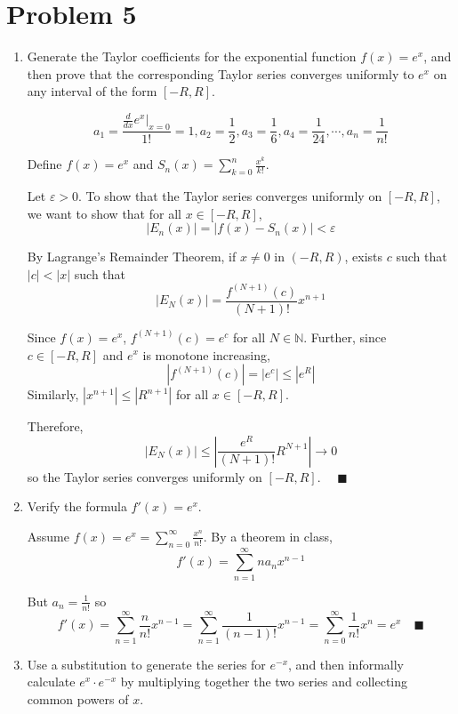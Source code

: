\documentclass[12pt]{article}
\newcommand{\N}{\mathbb{N}}
\newcommand{\qed}{\quad \blacksquare}
\newcommand{\abs}[1]{\left\vert #1 \right\vert}
\newcommand{\ep}{\varepsilon}
\begin{document}
\section*{Problem 5 }
\begin{enumerate}
	\item Generate the Taylor coefficients for the exponential function $f(x)=e^x$, and then prove that the corresponding Taylor series converges uniformly to $e^x$ on any interval of the form $[-R,R]$.
	
        \color{blue}
            \[a_1 = \frac{\frac{d}{dx} e^x \bigg\vert_{x = 0}}{1!} =1, a_2 = \frac{1}{2}, a_3 = \frac{1}{6}, a_4 = \frac{1}{24}, \cdots, a_n = \frac{1}{n!}\]
    
            Define $f(x) = e^x$ and $S_n(x) = \sum_{k=0}^{n} \frac{x^k}{k!}$.

            Let $\ep > 0$. To show that the Taylor series converges uniformly on $[-R,R]$, we want to show that for all $x \in [-R, R]$, 
            \[\abs{E_n(x)} = \abs{f(x) - S_n(x)} < \ep \]

            By Lagrange's Remainder Theorem, if $x \neq 0$ in $(-R, R)$, exists $c$ such that $\abs{c} < \abs{x}$ such that 
            \[\abs{E_N(x)} = \frac{f^{(N+1)}(c)}{(N+1)!} x^{n+1}\]

            Since $f(x) = e^x$, $f^{(N+1)}(c) = e^c$ for all $N \in \N$. Further, since $c \in [-R, R]$ and $e^x$ is monotone increasing, 
            \[\abs{f^{(N+1)}(c)} = \abs{e^c} \leq \abs{e^R}\]
            Similarly, $\abs{x^{n+1}} \leq \abs{R^{n+1}}$ for all $x \in [-R, R]$.
            
            Therefore,
            \[\abs{E_N(x)} \leq \abs{\frac{e^R}{(N+1)!}R^{N+1}} \to 0\]
            so the Taylor series converges uniformly on $[-R, R]$. $\qed$
        \color{black}

	\item Verify the formula $f'(x)=e^x$.
	
        \color{blue}
            Assume $f(x) = e^x = \sum_{n=0}^{\infty} \frac{x^n}{n!}$. By a theorem in class, 
            \[f'(x) = \sum_{n=1}^{\infty} na_nx^{n-1}\]

            But $a_n = \frac{1}{n!}$ so
            \[f'(x) = \sum_{n=1}^{\infty} \frac{n}{n!}x^{n-1} = \sum_{n=1}^{\infty} \frac{1}{(n-1)!}x^{n-1} = \sum_{n=0}^{\infty} \frac{1}{n!}x^n = e^x \qed \]
        \color{black}

	\item Use a substitution to generate the series for $e^{-x}$, and then informally calculate $e^x\cdot e^{-x}$ by multiplying together the two series and collecting common powers of $x$.
	

\end{enumerate}
\end{document}
